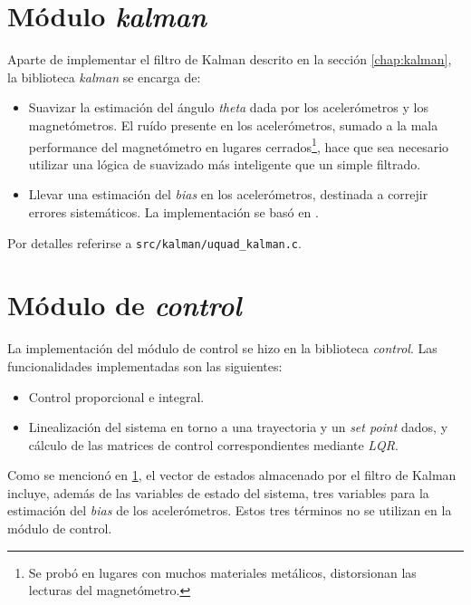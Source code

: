 \documentclass[main]{subfiles}
\begin{document}
\section{M\'odulo \textit{kalman}}
\label{sec:software:kalman}

Aparte de implementar el filtro de Kalman descrito en la secci\'on \ref{chap:kalman}, la biblioteca \textit{kalman} se encarga de:


\begin{itemize}
\item Suavizar la estimaci\'on del \'angulo \textit{theta} dada por los aceler\'ometros y los magnet\'ometros. El ru\'ido presente en los aceler\'ometros, sumado a la mala performance del magnet\'ometro en lugares cerrados\footnote{Se prob\'o en lugares con muchos materiales met\'alicos, distorsionan las lecturas del magnet\'ometro.}, hace que sea necesario utilizar una l\'ogica de suavizado m\'as inteligente que un simple filtrado.
\item Llevar una estimaci\'on del \textit{bias} en los aceler\'ometros, destinada a correjir errores sistem\'aticos. La implementaci\'on se bas\'o en \cite{}.
\end{itemize}

Por detalles referirse a \verb+src/kalman/uquad_kalman.c+.

\section{M\'odulo de \textit{control}}
\label{sec:software:control}

La implementación del módulo de control se hizo en la biblioteca \textit{control}. Las funcionalidades implementadas son las siguientes:

\begin{itemize}
\item Control proporcional e integral.
\item Linealización del sistema en torno a una trayectoria y un \textit{set point} dados, y c\'alculo de las matrices de control correspondientes mediante \textit{LQR}.
\end{itemize}

Como se mencion\'o en \ref{sec:software:kalman}, el vector de estados almacenado por el filtro de Kalman incluye, adem\'as de las variables de estado del sistema, tres variables para la estimaci\'on del \textit{bias} de los aceler\'ometros. Estos tres t\'erminos no se utilizan en la m\'odulo de control.
\end{document}
